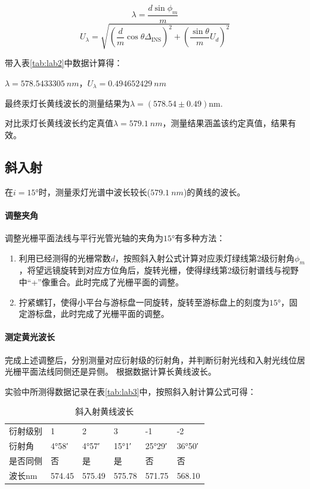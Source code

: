 \documentclass[UTF8,a4paper]{article}%
\begin{document}
$$\lambda=\frac{d\sin\phi_{m}}{m}$$
$$U_\lambda=\sqrt{\left(\frac{d}{m}\cos\theta\Delta_\mathrm{INS}\right)^2+\left(\frac{\sin\theta}{m}U_d\right)^2}$$

带入表\ref{tab:lab2}中数据计算得：

$\lambda=\qty{578.5433305}{nm}$，$U_\lambda=\qty{0.494652429}{nm}$

最终汞灯长黄线波长的测量结果为$\lambda=(578.54 \pm 0.49)\mathrm{nm}$.

对比汞灯长黄线波长约定真值$\lambda=\qty{579.1}{nm}$，测量结果涵盖该约定真值，结果有效。

\subsection{斜入射}
在$i=\ang{15}$时，测量汞灯光谱中波长较长($\qty{579.1}{nm}$)的黄线的波长。
\paragraph{调整夹角}
调整光栅平面法线与平行光管光轴的夹角为$\ang{15}$有多种方法：
\begin{enumerate}
    \item 利用已经测得的光栅常数$d$，按照斜入射公式计算对应汞灯绿线第2级衍射角$\phi_m$，将望远镜旋转到对应方位角后，旋转光栅，使得绿线第2级衍射谱线与视野中“+”像重合。此时完成了光栅平面的调整。
    \item 拧紧螺钉，使得小平台与游标盘一同旋转，旋转至游标盘上的刻度为$\ang{15}$，固定游标盘，此时完成了光栅平面的调整。
\end{enumerate}
\paragraph{测定黄光波长}
完成上述调整后，分别测量对应衍射级的衍射角，并判断衍射光线和入射光线位居光栅平面法线同侧还是异侧。
根据数据计算长黄线波长。

实验中所测得数据记录在表\ref{tab:lab3}中，按照斜入射计算公式可得：

\begin{table}[H]
    \centering
    \caption{斜入射黄线波长}
    \begin{tabular}{llllll}
        \hline
        衍射级别            & 1          & 2          & 3          & -1          & -2          \\
        衍射角             & \ang{4;58} & \ang{4;57} & \ang{15;1} & \ang{25;29} & \ang{36;50} \\
        是否同侧            & 否          & 是          & 是          & 否           & 否           \\
        波长$\mathrm{nm}$ & 574.45     & 575.49     & 575.78     & 571.75      & 568.10      \\ \hline
    \end{tabular}
\end{table}
\end{document}
